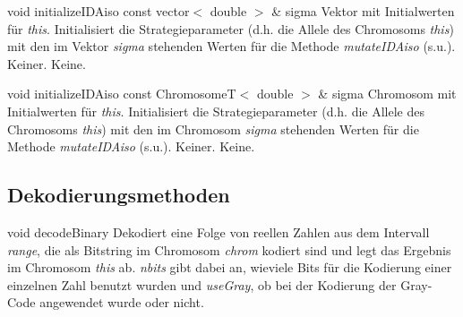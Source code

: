 \documentclass{report}
\begin{document}
\vspace{4ex}

\setNormalInstance
\printMethodWithOneParam
{void}
{initializeIDAiso}
{const vector$<$ double $>$ \&}
{sigma}
{Vektor mit Initialwerten f\"ur {\em this}.}
{Initialisiert die Strategieparameter (d.h. die Allele des Chromosoms
 {\em this}) mit den im Vektor {\em sigma} stehenden Werten f\"ur
 die Methode {\em mutateIDAiso} (s.u.).}
{Keiner.}
{Keine.}

\vspace{4ex}

\setNormalInstance
\printMethodWithOneParam
{void}
{initializeIDAiso}
{const ChromosomeT$<$ double $>$ \&}
{sigma}
{Chromosom mit Initialwerten f\"ur {\em this}.}
{Initialisiert die Strategieparameter (d.h. die Allele des Chromosoms
 {\em this}) mit den im Chromosom {\em sigma} stehenden Werten f\"ur
 die Methode {\em mutateIDAiso} (s.u.).}
{Keiner.}
{Keine.}


\subsection{Dekodierungsmethoden}

\setNormalInstance
\setCorrectWidthThree{8pt}
\printMethodWithParamsSaved
{void}
{}
{decodeBinary}
{Dekodiert eine Folge von reellen Zahlen aus dem Intervall {\em range}, 
 die als Bitstring im Chromosom {\em chrom} kodiert sind und legt das 
 Ergebnis im Chromosom {\em this} ab. {\em nbits} gibt dabei an, wieviele 
 Bits f\"ur die Kodierung einer einzelnen Zahl benutzt wurden und 
 {\em useGray}, ob bei der Kodierung der Gray-Code angewendet wurde oder 
 nicht.}
{}
\setCorrectWidthThree{4pt}
\end{document}
